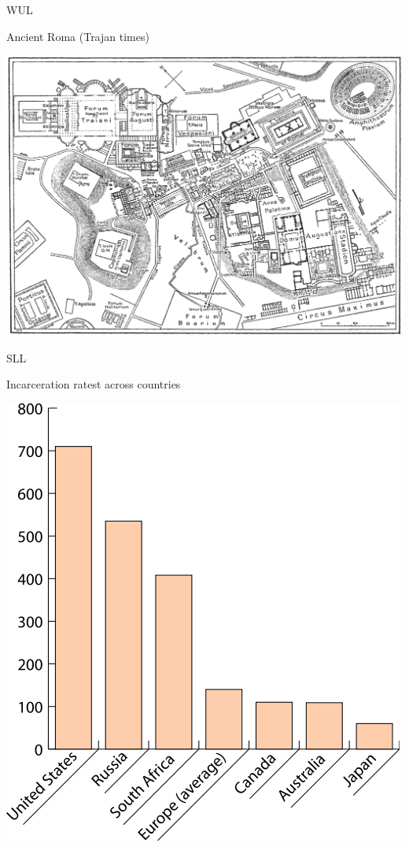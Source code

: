 \begin{map}{W}{UL}
\caption{Ancient Roma  (Trajan times)}
\label{map:roma}
\includegraphics[width=\chartwidth,height=\chartheight]{Rome}
\end{map}

\begin{chart}{S}{LL}
\caption{Incarceration ratest across countries}
\label{chart:incarceration}
\includegraphics[width=\chartwidth,height=\chartheight]{incarceration}  
\end{chart}

